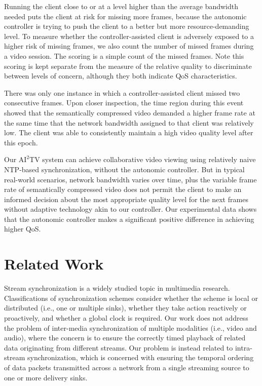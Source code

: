 \documentclass{sig-alternate}
\begin{document}

Running the client close to or at a level higher than the average
bandwidth needed puts the client at risk for missing more frames,
because the autonomic controller is trying to push the client to a
better but more resource-demanding level.  To measure whether the
controller-assisted client is adversely exposed to a higher risk of
missing frames, we also count the number of missed frames during a
video session.  The scoring is a simple count of the missed frames.
Note this scoring is kept separate from the measure of the relative
quality to discriminate between levels of concern, although they both
indicate QoS characteristics.

There was only one instance in which a controller-assisted client
missed two consecutive frames.  Upon closer inspection, the time
region during this event showed that the semantically compressed video
demanded a higher frame rate at the same time that the network
bandwidth assigned to that client was relatively low.  The client was
able to consistently maintain a high video quality level after this
epoch.


Our $\mathrm{AI}^2$TV system can achieve collaborative video viewing
using relatively naive NTP-based synchronization, without the
autonomic controller. But in typical real-world scenarios, network
bandwidth varies over time, plus the variable frame rate of
semantically compressed video does not permit the client to make an
informed decision about the most appropriate quality level for the
next frames without adaptive technology akin to our controller.  Our
experimental data shows that the autonomic controller makes a
significant positive difference in achieving higher QoS.

\section{Related Work} \label{related}

Stream synchronization is a widely studied topic in multimedia
research. Classifications of synchronization schemes consider whether
the scheme is local or distributed (i.e., one or multiple sinks),
whether they take action reactively or proactively, and whether a
global clock is required.  Our work does not address the problem of
inter-media synchronization of multiple modalities (i.e., video and
audio), where the concern is to ensure the correctly timed playback of
related data originating from different streams.  Our problem is
instead related to intra-stream synchronization, which is concerned
with ensuring the temporal ordering of data packets transmitted across
a network from a single streaming source to one or more delivery sinks.
\end{document}
